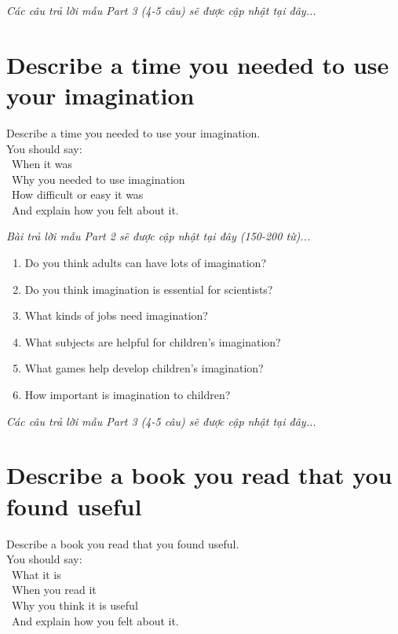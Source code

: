 \vspace{1em}
\textit{Các câu trả lời mẫu Part 3 (4-5 câu) sẽ được cập nhật tại đây...}
\vspace{2em}

\section{Describe a time you needed to use your imagination}
\begin{ieltsprompt}
Describe a time you needed to use your imagination. \\
You should say: \\
\textbullet\ When it was \\
\textbullet\ Why you needed to use imagination \\
\textbullet\ How difficult or easy it was \\
\textbullet\ And explain how you felt about it. \\
\end{ieltsprompt}

\vspace{1em}
\textit{Bài trả lời mẫu Part 2 sẽ được cập nhật tại đây (150-200 từ)...}
\vspace{2em}

\begin{ieltsprompt}
\begin{enumerate}[itemsep=4pt]
    \item Do you think adults can have lots of imagination?
    \item Do you think imagination is essential for scientists?
    \item What kinds of jobs need imagination?
    \item What subjects are helpful for children's imagination?
    \item What games help develop children's imagination?
    \item How important is imagination to children?
\end{enumerate}
\end{ieltsprompt}

\vspace{1em}
\textit{Các câu trả lời mẫu Part 3 (4-5 câu) sẽ được cập nhật tại đây...}
\vspace{2em}

\section{Describe a book you read that you found useful}
\begin{ieltsprompt}
Describe a book you read that you found useful. \\
You should say: \\
\textbullet\ What it is \\
\textbullet\ When you read it \\
\textbullet\ Why you think it is useful \\
\textbullet\ And explain how you felt about it. \\
\end{ieltsprompt}

